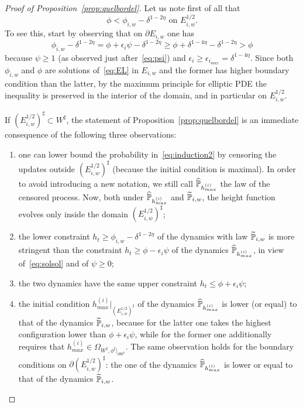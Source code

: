 \documentclass[AHL,Unicode,longabstracts,published]{cedram}
\renewcommand{\P}{\mathbb{P}}
\renewcommand{\d}{{\sharp }}
\newcommand*{\romanenumi}{\renewcommand*{\theenumi}{\roman{enumi}}}
\let\oldtilde\tilde
\renewcommand*{\tilde}[1]{\mathchoice{\widetilde{#1}}{\widetilde{#1}}{\oldtilde{#1}}{\oldtilde{#1}}}
\let\oldhat\hat
\renewcommand*{\hat}[1]{\mathchoice{\widehat{#1}}{\widehat{#1}}{\oldhat{#1}}{\oldhat{#1}}}
\begin{document}
\begin{proof}[Proof of Proposition~\ref{prop:quelbordel}]
Let us note first of all that
\begin{equation}\label{eq:solsol}
\phi< \phi_{i,w}-\delta^{1-2\eta} \text{ on } E^{1/2}_{i,w}.
\end{equation}
To see this, start by observing that on $\partial E_{i,w}$ one has
\begin{equation}\label{eq:psipsipsi}
\phi_{i,w}-\delta^{1-2\eta}=\phi+\epsilon_i \psi-\delta^{1-2\eta}\ge \phi+\delta^{1-4\eta}-\delta^{1-2\eta}>\phi
\end{equation}
because $\psi\ge 1$ (as observed just after~\eqref{eq:psi}) and $\epsilon_i\ge \epsilon_{i_{max}}=\delta^{1-4\eta}.$ Since both $\phi_{i,w}$ and $\phi$ are solutions of~\eqref{eq:EL} in $ E_{i,w}$ and the former has higher boundary condition than the latter, by the maximum principle for elliptic PDE the inequality is preserved in the interior of the domain, and in particular on $ E^{1/2}_{i,w}$.

If $(E^{1/2}_{i,w})^\d\subset W^\d$, the statement of Proposition~\ref{prop:quelbordel} is an immediate consequence of the following three observations:
\begin{enumerate}\romanenumi
\item one can lower bound the probability in~\eqref{eq:induction2} by censoring the updates outside $(E^{1/2}_{i,w})^\d$ (because the initial condition is maximal). In order to avoid introducing a new notation, we still call $\hat \P_{h^{(i)}_{max}}$ the law of the censored process. Now, both under $\hat \P_{h^{(i)}_{max}}$ and $\tilde\P_{i,w}$, the height function evolves only inside the domain $(E^{1/2}_{i,w})^\d$;

\item the lower constraint $h_t\ge \phi_{i,w}-\delta^{1-2\eta}$ of the dynamics with law $\tilde \P_{i,w}$ is more stringent than the constraint $h_t\ge \phi-\epsilon_i\psi$ of the dynamics $\hat \P_{h^{(i)}_{max}}$, in view of~\eqref{eq:solsol} and of $\psi\ge 0$;

\item the two dynamics have the same upper constraint $h_t\le \phi+\epsilon_i\psi$;
\item the initial condition $h^{(i)}_{max}|_{(E^{1/2}_{i,w})^\d}$ of the dynamics $\hat \P_{h^{(i)}_{max}}$ is lower (or equal) to that of the dynamics $\tilde \P_{i,w}$, because for the latter one takes the highest configuration lower than $\phi+\epsilon_i\psi$, while for the former one additionally requires that $h^{(i)}_{max}\in \Omega_{W^\d,\phi^\d|_{\partial W^\d}}$. The same observation holds for the boundary conditions on $\partial (E^{1/2}_{i,w})^\d$: the one of the dynamics $\hat \P_{h^{(i)}_{max}}$ is lower or equal to that of the dynamics $\tilde\P_{i,w}$.
\end{enumerate}


\end{proof}
\end{document}
